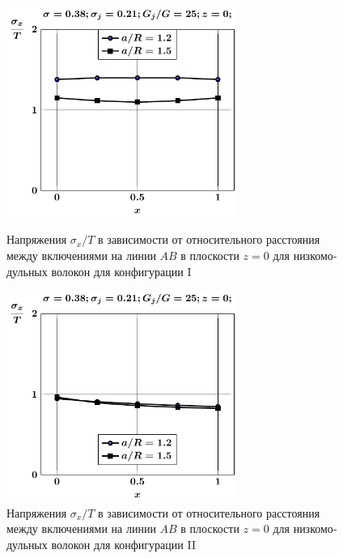 \begin{russian}
\begin{figure}[h!]
\centering\footnotesize
\parbox[b]{7.5cm}{\centering\includegraphics[width=7.5cm]{inc2a-a-h10-r10-g25-z0-sig_x.pdf}
\caption{Напряжения $\sigma_x/T$ в зависимости от относительного расстояния между включениями на линии $AB$ в плоскости $z=0$ для низкомодульных волокон для конфигурации I
\label{f:7:39}}}\hfil\hfil
\parbox[b]{7.5cm}{\centering\includegraphics[width=7.5cm]{inc2b-a-h10-r10-g25-z0-sig_x.pdf}
\caption{Напряжения $\sigma_x/T$ в зависимости от относительного расстояния между включениями на линии $AB$ в плоскости $z=0$ для низкомодульных волокон для конфигурации II
\label{f:7:40}}}
\end{figure}

%


\end{russian}
